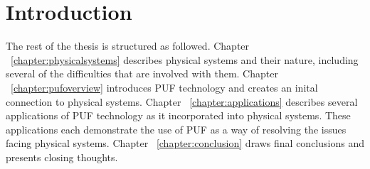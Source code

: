 %
%
%

\chapter{Introduction}
\label{chapter:intro}

The rest of the thesis is structured as followed. Chapter ~\ref{chapter:physicalsystems} describes physical systems and
their nature, including several of the difficulties that are involved with them. Chapter ~\ref{chapter:pufoverview} introduces
PUF technology and creates an inital connection to physical systems. Chapter ~\ref{chapter:applications} describes several
applications of PUF technology as it incorporated into physical systems. These applications each demonstrate the use of PUF
as a way of resolving the issues facing physical systems. Chapter ~\ref{chapter:conclusion} draws final conclusions and presents
closing thoughts.
